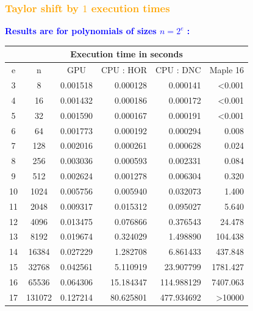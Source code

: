 \begin{frame}[fragile]
\frametitle{\textbf{\textcolor{orange}{Taylor shift by $1$ execution times}}}

\textcolor{blue}{\textbf{Results are for polynomials of sizes $n=2^e$ :}}

\begin{center}
\tiny{
\begin{tabular}{||c|c||c||r|r||r||}
   \hline
  \multicolumn{6}{||c||}{\textbf{Execution time in seconds}} \\
 \hline
  e  &    n    &    GPU     &  CPU : HOR  &   CPU : DNC  &  Maple 16   \\  \hline \hline
  3  &      8  &  0.001518  &   0.000128  &    0.000141  &     <0.001  \\
  4  &     16  &  0.001432  &   0.000186  &    0.000172  &     <0.001  \\
  5  &     32  &  0.001590  &   0.000167  &    0.000191  &     <0.001  \\
  6  &     64  &  0.001773  &   0.000192  &    0.000294  &      0.008  \\
  7  &    128  &  0.002016  &   0.000261  &    0.000628  &      0.024  \\
  8  &    256  &  0.003036  &   0.000593  &    0.002331  &      0.084  \\
  9  &    512  &  0.002624  &   0.001278  &    0.006304  &      0.320  \\
 10  &   1024  &  0.005756  &   0.005940  &    0.032073  &      1.400  \\
 11  &   2048  &  0.009317  &   0.015312  &    0.095027  &      5.640  \\
 12  &   4096  &  0.013475  &   0.076866  &    0.376543  &     24.478  \\
 13  &   8192  &  0.019674  &   0.324029  &    1.498890  &    104.438  \\
 14  &  16384  &  0.027229  &   1.282708  &    6.861433  &    437.848  \\
 15  &  32768  &  0.042561  &   5.110919  &   23.907799  &   1781.427  \\
 16  &  65536  &  0.064306  &  15.184347  &  114.988129  &   7407.063  \\
 17  & 131072  &  0.127214  &  80.625801  &  477.934692  &     >10000  \\
   \hline 
\end{tabular}
}
\end{center}

\end{frame}

